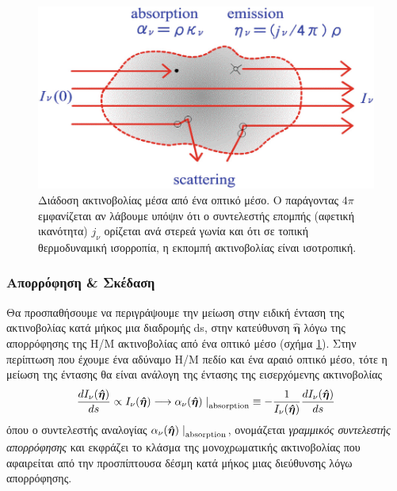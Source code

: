 \begin{figure}[h]
    \centering
    \includegraphics{Figures/radiative_transfer_scheme.png}
    \caption{Διάδοση ακτινοβολίας μέσα από ένα οπτικό μέσο. Ο παράγοντας $4\pi$ εμφανίζεται αν λάβουμε υπόψιν ότι ο συντελεστής επομπής (αφετική ικανότητα) $j_{\nu}$ ορίζεται ανά στερεά γωνία και ότι σε τοπική θερμοδυναμική ισορροπία, η εκπομπή ακτινοβολίας είναι ισοτροπική.}
    \label{fig:radiative_transfer_scheme}
\end{figure}


\subsubsection{Απορρόφηση \& Σκέδαση}
Θα προσπαθήσουμε να περιγράψουμε την μείωση στην ειδική ένταση της ακτινοβολίας κατά μήκος μια διαδρομής ds, στην κατεύθυνση $\boldsymbol{\hat{\eta}}$ λόγω της απορρόφησης της Η/Μ ακτινοβολίας από ένα οπτικό μέσο (σχήμα \ref{fig:radiative_transfer_scheme}). Στην περίπτωση που έχουμε ένα αδύναμο Η/Μ πεδίο και ένα αραιό οπτικό μέσο, τότε η μείωση της έντασης θα είναι ανάλογη της έντασης της εισερχόμενης ακτινοβολίας
\begin{equation}
    \label{eq:linear_absorption_coefficient}
    \frac{dI_{\nu}(\boldsymbol{\hat{\eta}})}{ds} \propto I_{\nu}(\boldsymbol{\hat{\eta}}) \longrightarrow \alpha_{\nu}(\boldsymbol{\hat{\eta}}) \left. \right|_{\rm absorption} \equiv - \frac{1}{I_{\nu}(\boldsymbol{\hat{\eta}})} \frac{dI_{\nu}(\boldsymbol{\hat{\eta}})}{ds}
\end{equation}
όπου ο συντελεστής αναλογίας $\alpha_{\nu}(\boldsymbol{\hat{\eta}}) \left. \right|_{\rm absorption}$, ονομάζεται \textit{γραμμικός συντελεστής απορρόφησης} και εκφράζει το κλάσμα της μονοχρωματικής ακτινοβολίας που αφαιρείται από την προσπίπτουσα δέσμη κατά μήκος μιας διεύθυνσης λόγω απορρόφησης.

